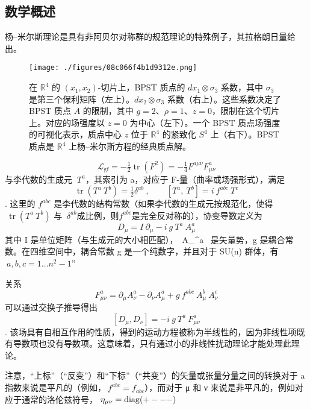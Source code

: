 \subsection{数学概述}
杨–米尔斯理论是具有非阿贝尔对称群的规范理论的特殊例子，其拉格朗日量给出。
\begin{figure}[ht]
\centering
\texttt{[image: ./figures/08c066f4b1d9312e.png]}
\caption{在 \( \mathbb{R}^4 \) 的 \( (x_1, x_2) \)-切片上，BPST 质点的 \( dx_1 \otimes \sigma_3 \) 系数，其中 \( \sigma_3 \) 是第三个保利矩阵（左上）。\( dx_2 \otimes \sigma_3 \) 系数（右上）。这些系数决定了 BPST 质点 \( A \) 的限制，其中 \( g=2 \)、\( \rho=1 \)、\( z=0 \)，限制在这个切片上。对应的场强度以 \( z=0 \) 为中心（左下）。一个 BPST 质点场强度的可视化表示，质点中心 \( z \) 位于 \( \mathbb{R}^4 \) 的紧致化 \( S^4 \) 上（右下）。BPST 质点是 \( \mathbb{R}^4 \) 上杨–米尔斯方程的经典质点解。} \label{fig_Yang_1}
\end{figure}
\[\displaystyle \ {\mathcal {L}}_{\mathrm {gf} }=-{\tfrac {1}{2}}\operatorname {tr} (F^{2})=-{\tfrac {1}{4}}F^{a\mu \nu }F_{\mu \nu }^{a}~\] 
与李代数的生成元 \(\displaystyle \ T^{a}\)，其索引为 a，对应于 F-量（曲率或场强形式），满足
\[\displaystyle \ \operatorname {tr} \left(T^{a}\ T^{b}\right)={\tfrac {1}{2}}\delta ^{ab}\ ,\qquad \left[T^{a},\ T^{b}\right]=i\ f^{abc}\ T^{c}~\]. 
这里的 \(f^{abc}\) 是李代数的结构常数（如果李代数的生成元按规范化，使得 \(\displaystyle \ \operatorname {tr} (T^{a}\ T^{b})\) 与 \(\displaystyle \ \delta ^{ab}\)成比例，则\(f^{abc}\)是完全反对称的），协变导数定义为
\[\displaystyle \ D_{\mu }=I\ \partial _{\mu }-i\ g\ T^{a}\ A_{\mu }^{a}~\]
其中 I 是单位矩阵（与生成元的大小相匹配），{\displaystyle \ A_{\mu }^{a}\ } 是矢量势，g 是耦合常数。在四维空间中，耦合常数 g 是一个纯数字，并且对于 SU(n) 群体，有\(\displaystyle \ a,b,c=1\ldots n^{2}-1\)”

关系
\[\displaystyle \ F_{\mu \nu }^{a}=\partial _{\mu }A_{\nu }^{a}-\partial _{\nu }A_{\mu }^{a}+g\ f^{abc}\ A_{\mu }^{b}\ A_{\nu }^{c}~\] 
可以通过交换子推导得出
\[\displaystyle \ \left[D_{\mu },D_{\nu }\right]=-i\ g\ T^{a}\ F_{\mu \nu }^{a}~\]. 
该场具有自相互作用的性质，得到的运动方程被称为半线性的，因为非线性项既有导数项也没有导数项。这意味着，只有通过小的非线性扰动理论才能处理此理论。

注意，“上标”（“反变”）和“下标”（“共变”）的矢量或张量分量之间的转换对于 a 指数来说是平凡的（例如，\(\displaystyle \ f^{abc}=f_{abc}\)），而对于 μ 和 ν 来说是非平凡的，例如对应于通常的洛伦兹符号，\(\displaystyle \ \eta _{\mu \nu }={\rm {diag}}(+---)\)

